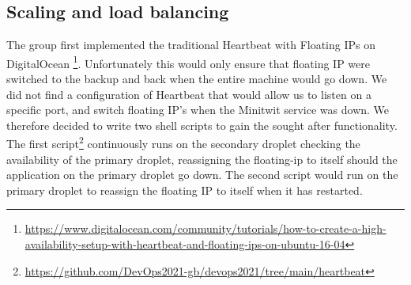\subsection{Scaling and load balancing}\label{subsection:scaling} 
The group first implemented the traditional Heartbeat with Floating IPs on DigitalOcean \footnote{\url{https://www.digitalocean.com/community/tutorials/how-to-create-a-high-availability-setup-with-heartbeat-and-floating-ips-on-ubuntu-16-04}}. Unfortunately this would only ensure that floating IP were switched to the backup and back when the entire machine would go down. We did not find a configuration of Heartbeat that would allow us to listen on a specific port, and switch floating IP's when the Minitwit service was down. We therefore decided to write two shell scripts to gain the sought after functionality. The first script\footnote{\url{https://github.com/DevOps2021-gb/devops2021/tree/main/heartbeat}} continuously runs on the secondary droplet checking the availability of the primary droplet, reassigning the floating-ip to itself should the application on the primary droplet go down. The second script would run on the primary droplet to reassign the floating IP to itself when it has restarted.
